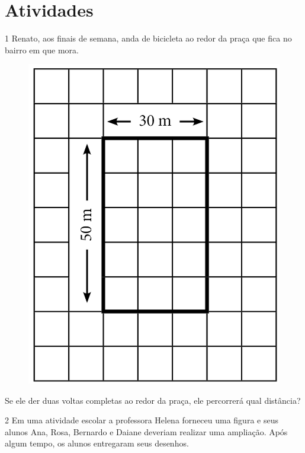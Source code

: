 \section*{Atividades}

\num{1} Renato, aos finais de semana, anda de bicicleta ao redor da praça
que fica no bairro em que mora.

\begin{figure}[htpb!]
\centering
\includegraphics[width=.8\textwidth]{../ilustracoes/MAT5/SAEB_5ANO_MAT_figura35.png}
\end{figure}

Se ele der duas voltas completas ao redor da praça, ele percorrerá qual
distância?



\pagebreak

\num{2} Em uma atividade escolar a professora Helena forneceu uma figura e
seus alunos Ana, Rosa, Bernardo e Daiane deveriam realizar uma ampliação. Após algum tempo, os alunos entregaram seus desenhos.

